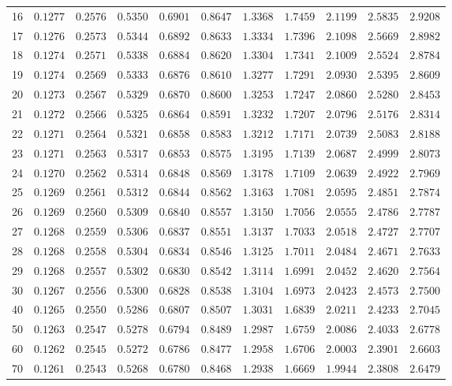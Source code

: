 \begin{center}
\begin{tabular}{r|rrrrrrrrrr}
16&$0.1277$&$0.2576$&$0.5350$&$0.6901$&$0.8647$&$1.3368$&$1.7459$&$ 2.1199$&$ 2.5835$&$ 2.9208$\\
17&$0.1276$&$0.2573$&$0.5344$&$0.6892$&$0.8633$&$1.3334$&$1.7396$&$ 2.1098$&$ 2.5669$&$ 2.8982$\\
18&$0.1274$&$0.2571$&$0.5338$&$0.6884$&$0.8620$&$1.3304$&$1.7341$&$ 2.1009$&$ 2.5524$&$ 2.8784$\\
19&$0.1274$&$0.2569$&$0.5333$&$0.6876$&$0.8610$&$1.3277$&$1.7291$&$ 2.0930$&$ 2.5395$&$ 2.8609$\\
20&$0.1273$&$0.2567$&$0.5329$&$0.6870$&$0.8600$&$1.3253$&$1.7247$&$ 2.0860$&$ 2.5280$&$ 2.8453$\\
21&$0.1272$&$0.2566$&$0.5325$&$0.6864$&$0.8591$&$1.3232$&$1.7207$&$ 2.0796$&$ 2.5176$&$ 2.8314$\\
22&$0.1271$&$0.2564$&$0.5321$&$0.6858$&$0.8583$&$1.3212$&$1.7171$&$ 2.0739$&$ 2.5083$&$ 2.8188$\\
23&$0.1271$&$0.2563$&$0.5317$&$0.6853$&$0.8575$&$1.3195$&$1.7139$&$ 2.0687$&$ 2.4999$&$ 2.8073$\\
24&$0.1270$&$0.2562$&$0.5314$&$0.6848$&$0.8569$&$1.3178$&$1.7109$&$ 2.0639$&$ 2.4922$&$ 2.7969$\\
25&$0.1269$&$0.2561$&$0.5312$&$0.6844$&$0.8562$&$1.3163$&$1.7081$&$ 2.0595$&$ 2.4851$&$ 2.7874$\\
26&$0.1269$&$0.2560$&$0.5309$&$0.6840$&$0.8557$&$1.3150$&$1.7056$&$ 2.0555$&$ 2.4786$&$ 2.7787$\\
27&$0.1268$&$0.2559$&$0.5306$&$0.6837$&$0.8551$&$1.3137$&$1.7033$&$ 2.0518$&$ 2.4727$&$ 2.7707$\\
28&$0.1268$&$0.2558$&$0.5304$&$0.6834$&$0.8546$&$1.3125$&$1.7011$&$ 2.0484$&$ 2.4671$&$ 2.7633$\\
29&$0.1268$&$0.2557$&$0.5302$&$0.6830$&$0.8542$&$1.3114$&$1.6991$&$ 2.0452$&$ 2.4620$&$ 2.7564$\\
30&$0.1267$&$0.2556$&$0.5300$&$0.6828$&$0.8538$&$1.3104$&$1.6973$&$ 2.0423$&$ 2.4573$&$ 2.7500$\\
40&$0.1265$&$0.2550$&$0.5286$&$0.6807$&$0.8507$&$1.3031$&$1.6839$&$ 2.0211$&$ 2.4233$&$ 2.7045$\\
50&$0.1263$&$0.2547$&$0.5278$&$0.6794$&$0.8489$&$1.2987$&$1.6759$&$ 2.0086$&$ 2.4033$&$ 2.6778$\\
60&$0.1262$&$0.2545$&$0.5272$&$0.6786$&$0.8477$&$1.2958$&$1.6706$&$ 2.0003$&$ 2.3901$&$ 2.6603$\\
70&$0.1261$&$0.2543$&$0.5268$&$0.6780$&$0.8468$&$1.2938$&$1.6669$&$ 1.9944$&$ 2.3808$&$ 2.6479$\\

\end{tabular}
\end{center}
